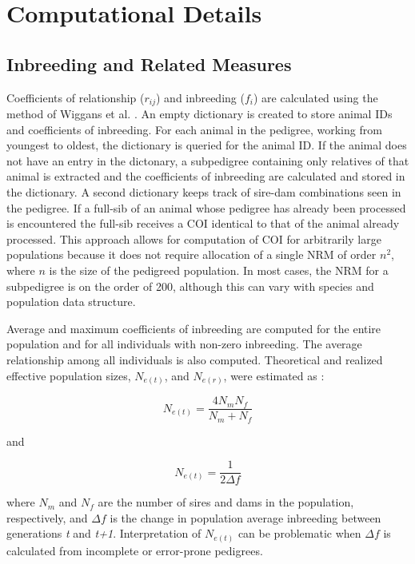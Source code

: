 \section{Computational Details}
\label{sec:methodology-computational-details}
\subsection{Inbreeding and Related Measures}
\label{sec:methodology-computation-inbreeding}
Coefficients of relationship ($r_{ij}$) and inbreeding ($f_{i}$) are calculated using the method of Wiggans et al. \citeyear{ref337}.  An empty dictionary is created to store animal IDs and coefficients of inbreeding.  For each animal in the pedigree, working from youngest to oldest, the dictionary is queried for the animal ID.  If the animal does not have an entry in the dictonary, a subpedigree containing only relatives of that animal is extracted and the coefficients of inbreeding are calculated and stored in the dictionary.  A second dictionary keeps track of sire-dam combinations seen in the pedigree.  If a full-sib of an animal whose pedigree has already been processed is encountered the full-sib receives a COI identical to that of the animal already processed.  This approach allows for computation of COI for arbitrarily large populations because it does not require allocation of a single NRM of order $n^{2}$, where $n$ is the size of the pedigreed population.  In most cases, the NRM for a subpedigree is on the order of 200, although this can vary with species and population data structure.

Average and maximum coefficients of inbreeding are computed for the entire population and for all individuals with non-zero inbreeding.  The average relationship among all individuals is also computed.  Theoretical and realized effective population
sizes, $N_{e(t)}$, and $N_{e(r)}$, were estimated as \cite{ref91}:

\[ N_{e(t)} = \dfrac{ 4 N_m N_f } { N_m + N_f } \]

and

\[ N_{e(t)} = \dfrac{1}{2 \Delta f} \]

where $N_m$ and $N_f$ are the number of sires and dams in the population, respectively, and $\Delta f$ is the change in
population average inbreeding between generations \textit{t} and \textit{t+1}.  Interpretation of $N_{e(t)}$ can be
problematic when $\Delta f$ is calculated from incomplete or error-prone pedigrees.

